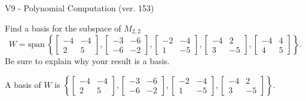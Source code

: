 \begin{exercise}
  \begin{exerciseTitle}V9 - Polynomial Computation (ver. 153)\end{exerciseTitle}
  \begin{exerciseStatement}
    Find a basis for the subspace of \(M_{2,2}\) 
\[W=\mathrm{span}\ \left\{\left[\begin{array}{cc}
-4 & -4 \\
2 & 5
\end{array}\right] , \left[\begin{array}{cc}
-3 & -6 \\
-6 & -2
\end{array}\right] , \left[\begin{array}{cc}
-2 & -4 \\
1 & -5
\end{array}\right] , \left[\begin{array}{cc}
-4 & 2 \\
3 & -5
\end{array}\right] , \left[\begin{array}{cc}
-4 & 4 \\
4 & 5
\end{array}\right]\right\}.\]
 Be sure to explain why your result is a basis.


  \end{exerciseStatement}
  \begin{exerciseAnswer}
   A basis of \(W\) is  \(\left\{\left[\begin{array}{cc}
-4 & -4 \\
2 & 5
\end{array}\right] , \left[\begin{array}{cc}
-3 & -6 \\
-6 & -2
\end{array}\right] , \left[\begin{array}{cc}
-2 & -4 \\
1 & -5
\end{array}\right] , \left[\begin{array}{cc}
-4 & 2 \\
3 & -5
\end{array}\right]\right\}\).
  


  \end{exerciseAnswer}
\end{exercise}